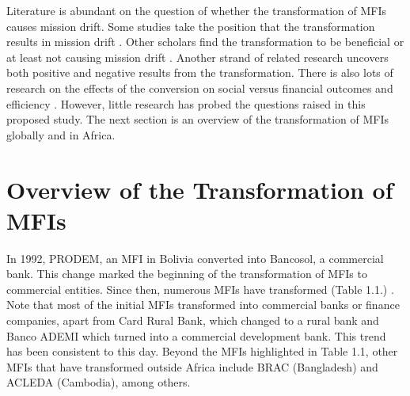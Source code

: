 \documentclass[a4paper, nobind]{templates/ociamthesis}
\begin{document}
Literature is abundant on the question of whether the transformation of MFIs causes mission drift. Some studies take the position that the transformation results in mission drift \autocite{mia2017mission,wagenaar2012institutional,lopatta2017sustainable,roberts2013endogeneity}. Other scholars find the transformation to be beneficial or at least not causing mission drift \autocite{im2015profits,lutzenkirchen2012microfinance,quayes2012depth,mersland2010microfinance}. Another strand of related research uncovers both positive and negative results from the transformation\autocite{kar2012does,caudill2009microfinance}. There is also lots of research on the effects of the conversion on social versus financial outcomes and efficiency \autocite{bogan2012capital,kar2012does,tchuigoua2014institutional,khachatryan2017performance}. However, little research has probed the questions raised in this proposed study. The next section is an overview of the transformation of MFIs globally and in Africa.

\hypertarget{overview-of-the-transformation-of-mfis}{%
\section{Overview of the Transformation of MFIs}\label{overview-of-the-transformation-of-mfis}}

\noindent In 1992, PRODEM, an MFI in Bolivia converted into Bancosol, a commercial bank. This change marked the beginning of the transformation of MFIs to commercial entities. Since then, numerous MFIs have transformed (Table 1.1.) . Note that most of the initial MFIs transformed into commercial banks or finance companies, apart from Card Rural Bank, which changed to a rural bank and Banco ADEMI which turned into a commercial development bank. This trend has been consistent to this day. Beyond the MFIs highlighted in Table 1.1, other MFIs that have transformed outside Africa include BRAC (Bangladesh) and ACLEDA (Cambodia), among others.
\end{document}
